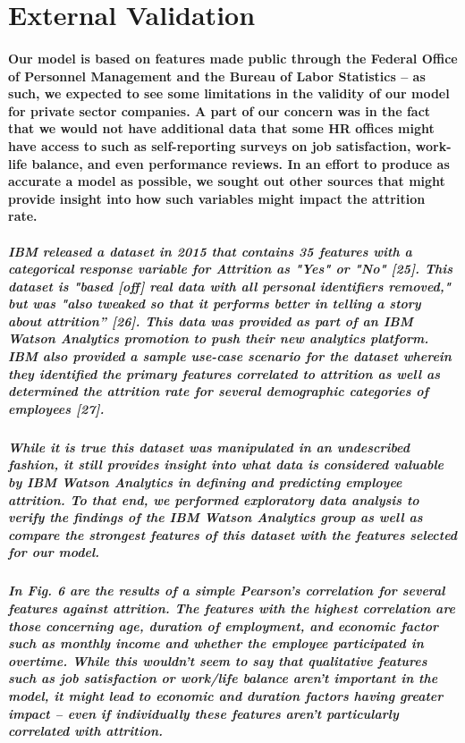 \documentclass{article}
\begin{document}
\section{External Validation}

\paragraph{Our model is based on features made public through the Federal Office of Personnel Management and the Bureau of Labor Statistics – as such, we expected to see some limitations in the validity of our model for private sector companies. A part of our concern was in the fact that we would not have additional data that some HR offices might have access to such as self-reporting surveys on job satisfaction, work-life balance, and even performance reviews. In an effort to produce as accurate a model as possible, we sought out other sources that might provide insight into how such variables might impact the attrition rate.}

\subparagraph{IBM released a dataset in 2015 that contains 35 features with a categorical response variable for Attrition as "Yes" or "No" [25]. This dataset is "based [off] real data with all personal identifiers removed," but was "also tweaked so that it performs better in telling a story about attrition” [26]. This data was provided as part of an IBM Watson Analytics promotion to push their new analytics platform. IBM also provided a sample use-case scenario for the dataset wherein they identified the primary features correlated to attrition as well as determined the attrition rate for several demographic categories of employees [27].}

\subparagraph{While it is true this dataset was manipulated in an undescribed fashion, it still provides insight into what data is considered valuable by IBM Watson Analytics in defining and predicting employee attrition. To that end, we performed exploratory data analysis to verify the findings of the IBM Watson Analytics group as well as compare the strongest features of this dataset with the features selected for our model.}

\subparagraph{In Fig. 6 are the results of a simple Pearson's correlation for several features against attrition. The features with the highest correlation are those concerning age, duration of employment, and economic factor such as monthly income and whether the employee participated in overtime. While this wouldn't seem to say that qualitative features such as job satisfaction or work/life balance aren't important in the model, it might lead to economic and duration factors having greater impact – even if individually these features aren't particularly correlated with attrition.}
\end{document}
